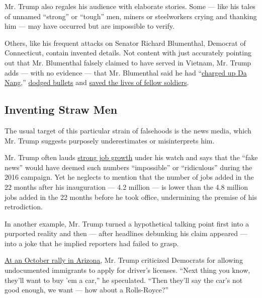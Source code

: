 Mr. Trump also regales his audience with elaborate stories. Some ---
like his tales of unnamed ``strong'' or ``tough'' men, miners or
steelworkers crying and thanking him --- may have occurred but are
impossible to verify.

Others, like his frequent attacks on Senator Richard Blumenthal,
Democrat of Connecticut, contain invented details. Not content with just
accurately pointing out that Mr. Blumenthal falsely claimed to have
served in Vietnam, Mr. Trump adds --- with no evidence --- that Mr.
Blumenthal said he had
``\href{https://www.c-span.org/video/?452582-1/president-trump-rally-topeka-kansas\&start=3080}{charged
up Da Nang},''
\href{https://www.c-span.org/video/?453851-1/president-trump-campaigns-republicans-indiana\&start=698}{dodged
bullets} and
\href{https://www.c-span.org/video/?c4754001/president-trump-criticizes-senator-blumenthal}{saved
the lives of fellow soldiers}.

\hypertarget{inventing-straw-men}{%
\subsection{Inventing Straw Men}\label{inventing-straw-men}}

The usual target of this particular strain of falsehoods is the news
media, which Mr. Trump suggests purposely underestimates or
misinterprets him.

Mr. Trump often lauds
\href{https://data.bls.gov/timeseries/ces0000000001?output_view=net_1mth}{strong
job growth} under his watch and says that the ``fake news'' would have
deemed such numbers ``impossible'' or ``ridiculous'' during the 2016
campaign. Yet he neglects to mention that the number of jobs added in
the 22 months after his inauguration --- 4.2 million --- is lower than
the 4.8 million jobs added in the 22 months before he took office,
undermining the premise of his retrodiction.

In another example, Mr. Trump turned a hypothetical talking point first
into a purported reality and then --- after headlines debunking his
claim appeared --- into a joke that he implied reporters had failed to
grasp.

\href{https://www.c-span.org/video/?453287-1/president-trump-campaigns-mesa-arizona}{At
an October rally in Arizona}, Mr. Trump criticized Democrats for
allowing undocumented immigrants to apply for driver's licenses. ``Next
thing you know, they'll want to buy 'em a car,'' he speculated. ``Then
they'll say the car's not good enough, we want --- how about a
Rolls-Royce?''

